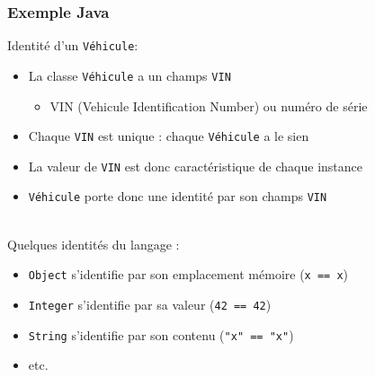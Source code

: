 \documentclass[draft]{beamer}
\DeclareRobustCommand{\todo}[1]{\ifdraft{\textbf{\textcolor{red}{[#1]}}}{}}
\begin{document}
\begin{frame}
\frametitle{Exemple Java}
\def\class{\lstinline{Véhicule}\xspace}
\def\prop{\lstinline{VIN}\xspace}
Identité d'un \class :
\begin{itemize}
 \item La classe \class a un champs \prop
 \begin{itemize}
  \item VIN (Vehicule Identification Number) ou numéro de série
 \end{itemize}
 \item Chaque \prop est unique : chaque \class a le sien
 \item La valeur de \prop est donc caractéristique de chaque instance
 \item \class porte donc une identité par son champs \prop
\end{itemize}
~\\
Quelques identités du langage :
\begin{itemize}
 \item \lstinline{Object} s'identifie par son emplacement mémoire (\lstinline{x == x})
 \item \lstinline{Integer} s'identifie par sa valeur (\lstinline{42 == 42})
 \item \lstinline{String} s'identifie par son contenu (\lstinline{"x" == "x"})
 \item etc.
\end{itemize}
\end{frame}
\end{document}
